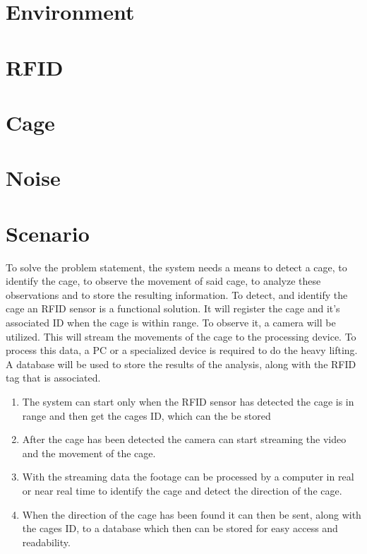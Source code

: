 \section{Environment}

\section{RFID}


\section{Cage}

\section{Noise}

\section{Scenario}

To solve the problem statement, the system needs a means to detect a cage, to identify the cage, to observe the movement of said cage, to analyze these observations and to store the resulting information. To detect, and identify the cage an RFID sensor is a functional solution. It will register the cage and it's associated ID when the cage is within range. To observe it, a camera will be utilized. This will stream the movements of the cage to the processing device. To process this data, a PC or a specialized device is required to do the heavy lifting. A database will be used to store the results of the analysis, along with the RFID tag that is associated.

\begin{enumerate}
    \item The system can start only when the RFID sensor has detected the cage is in range and then get the cages ID, which can the be stored
    \item After the cage has been detected the camera can start streaming the video and the movement of the cage.
    \item With the streaming data the footage can be processed by a computer in real or near real time to identify the cage and detect the direction of the cage.
    \item When the direction of the cage has been found it can then be sent, along with the cages ID, to a database which then can be stored for easy access and readability.
\end{enumerate}

